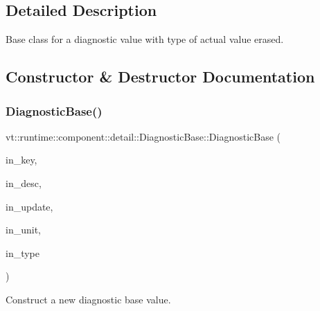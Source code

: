 \subsection{Detailed Description}
Base class for a diagnostic value with type of actual value erased. 

\subsection{Constructor \& Destructor Documentation}
\mbox{\label{structvt_1_1runtime_1_1component_1_1detail_1_1_diagnostic_base_ae96f19eb79a538b5f21d6f4a6a2a5e0a}} 
\subsubsection{\texorpdfstring{Diagnostic\+Base()}{DiagnosticBase()}}
{\footnotesize\ttfamily vt\+::runtime\+::component\+::detail\+::\+Diagnostic\+Base\+::\+Diagnostic\+Base (\begin{DoxyParamCaption}\item[{std\+::string const \&}]{in\+\_\+key,  }\item[{std\+::string const \&}]{in\+\_\+desc,  }\item[{\hyperlink{namespacevt_1_1runtime_1_1component_a896637e6e183a909a17bfd8d3943c206}{Diagnostic\+Update}}]{in\+\_\+update,  }\item[{\hyperlink{namespacevt_1_1runtime_1_1component_a99ec18b08862c712176126bb7d0e307a}{Diagnostic\+Unit}}]{in\+\_\+unit,  }\item[{\hyperlink{namespacevt_1_1runtime_1_1component_af0bb99d9a054682217874bdc735ecac0}{Diagnostic\+Type\+Enum}}]{in\+\_\+type }\end{DoxyParamCaption})\hspace{0.3cm}{\ttfamily [inline]}}



Construct a new diagnostic base value. 


